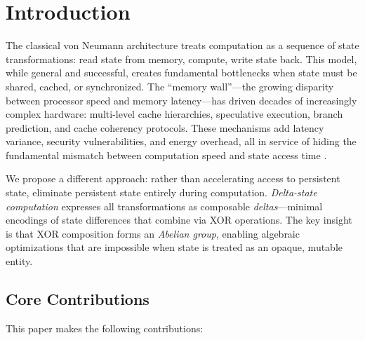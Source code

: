 \documentclass[11pt,letterpaper]{article}
\theoremstyle{plain}
\theoremstyle{definition}
\theoremstyle{remark}
\begin{document}
\section{Introduction}
\label{sec:introduction}

The classical von Neumann architecture treats computation as a sequence of state transformations: read state from memory, compute, write state back. This model, while general and successful, creates fundamental bottlenecks when state must be shared, cached, or synchronized. The ``memory wall''---the growing disparity between processor speed and memory latency---has driven decades of increasingly complex hardware: multi-level cache hierarchies, speculative execution, branch prediction, and cache coherency protocols. These mechanisms add latency variance, security vulnerabilities, and energy overhead, all in service of hiding the fundamental mismatch between computation speed and state access time \cite{wulf1995hitting,hennessy2019new}.

We propose a different approach: rather than accelerating access to persistent state, eliminate persistent state entirely during computation. \emph{Delta-state computation} expresses all transformations as composable \emph{deltas}---minimal encodings of state differences that combine via XOR operations. The key insight is that XOR composition forms an \emph{Abelian group}, enabling algebraic optimizations that are impossible when state is treated as an opaque, mutable entity.

\subsection{Core Contributions}

This paper makes the following contributions:
\end{document}
